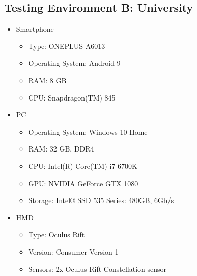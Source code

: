 \begin{appendices}
  \section{Testing Environment B: University}
  \begin{itemize}
    \item Smartphone
    \begin{itemize}
      \item Type: ONEPLUS A6013
      \item Operating System: Android 9
      \item RAM: 8 GB
      \item CPU: Snapdragon(TM) 845 %
    \end{itemize}
    \item \ac{PC}
    \begin{itemize} %
      \item Operating System: Windows 10 Home
      \item RAM: 32 GB, DDR4
      \item CPU: Intel(R) Core(TM) i7-6700K %
      \item GPU: NVIDIA GeForce GTX 1080
      \item Storage: Intel® SSD 535 Series: 480GB, 6Gb/s
    \end{itemize}
    \item \ac{HMD}
    \begin{itemize} %
      \item Type: Oculus Rift
      \item Version: Consumer Version 1
      \item Sensors: 2x Oculus Rift Constellation sensor
    \end{itemize}
  \end{itemize}

  
\end{appendices}